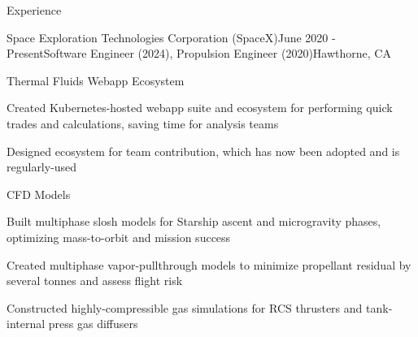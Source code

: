 \documentclass{resume} %
\begin{document}
\begin{rSection}{Experience}
\begin{rSubsection}{{Space Exploration Technologies Corporation (SpaceX)}}{June 2020 - Present}{Software Engineer (2024), Propulsion Engineer (2020)}{Hawthorne, CA}
  \begin{rSubsubsection}{Thermal Fluids Webapp Ecosystem}
    \item {\small Created Kubernetes-hosted webapp suite and ecosystem for performing quick trades and calculations, saving time for analysis teams}
    \item {\small Designed ecosystem for team contribution, which has now been adopted and is regularly-used}
  \end{rSubsubsection}

  \begin{rSubsubsection}{CFD Models}
    \item {\small Built multiphase slosh models for Starship ascent and microgravity phases, optimizing mass-to-orbit and mission success}
    \item {\small Created multiphase vapor-pullthrough models to minimize propellant residual by several tonnes and assess flight risk}
    \item {\small Constructed highly-compressible gas simulations for RCS thrusters and tank-internal press gas diffusers  }
  \end{rSubsubsection}




\end{rSubsection}
\end{rSection}
\end{document}
